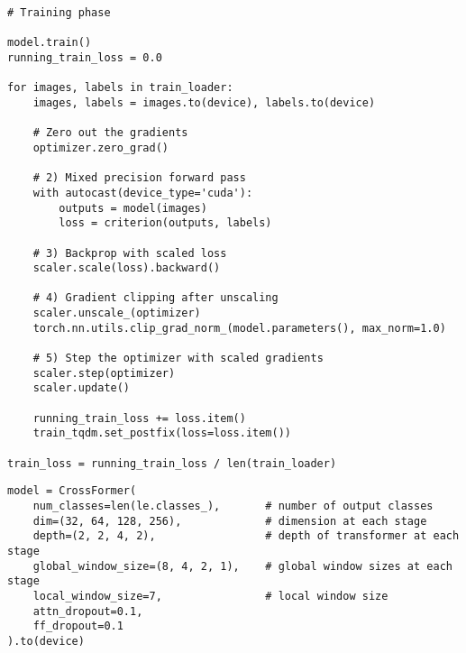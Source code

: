 \begin{samepage}
\begin{lstlisting}[style=mypython, caption={Training loop code example}, label={lst:loop-train}]
# Training phase

model.train()
running_train_loss = 0.0
    
for images, labels in train_loader:
    images, labels = images.to(device), labels.to(device)

    # Zero out the gradients
    optimizer.zero_grad()
    
    # 2) Mixed precision forward pass
    with autocast(device_type='cuda'):
        outputs = model(images)
        loss = criterion(outputs, labels)
    
    # 3) Backprop with scaled loss
    scaler.scale(loss).backward()
    
    # 4) Gradient clipping after unscaling
    scaler.unscale_(optimizer)
    torch.nn.utils.clip_grad_norm_(model.parameters(), max_norm=1.0)
    
    # 5) Step the optimizer with scaled gradients
    scaler.step(optimizer)
    scaler.update()
    
    running_train_loss += loss.item()
    train_tqdm.set_postfix(loss=loss.item())
    
train_loss = running_train_loss / len(train_loader)
\end{lstlisting}
\end{samepage}

\begin{samepage}
\begin{lstlisting}[style=mypython, caption={CrossFormer model initialization code example}, label={lst:model-model}]
model = CrossFormer(
    num_classes=len(le.classes_),       # number of output classes
    dim=(32, 64, 128, 256),             # dimension at each stage
    depth=(2, 2, 4, 2),                 # depth of transformer at each stage
    global_window_size=(8, 4, 2, 1),    # global window sizes at each stage
    local_window_size=7,                # local window size
    attn_dropout=0.1,
    ff_dropout=0.1
).to(device)
\end{lstlisting}
\end{samepage}

%
